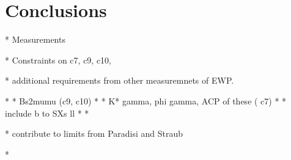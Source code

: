\chapter{Conclusions}	

* Measurements 

* Constraints on c7, c9, c10, 

* additional requirements from other measuremnets of EWP.

* * Bs2mumu (c9, c10)
* * K* gamma, phi gamma, ACP of these ( c7)
* * include b to SXs ll
* * 


* contribute to limits from Paradisi and Straub

* 